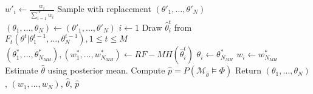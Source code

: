 \begin{algorithm}[H]
\begin{algorithmic}[1]
        \State $w'_i \leftarrow \frac{w_i}{\sum_{i=1}^N w_i} $
        \EndWhile
        \State Sample with replacement $(\theta'_1,\ldots,\theta'_N)$ 
        \State $(\theta_1,\ldots,\theta_N) \leftarrow (\theta'_1,\ldots,\theta'_N)$
        \State $i \leftarrow 1$
         
        \State Draw $\hat{\theta}^t_i$ from $F_t(\theta^t | \theta^{t-1}_1,\ldots,\theta^{t-1}_N), 1\leq t \leq M$
        \State $(\theta^*_1,\ldots,\theta^*_{N_{MH}}), (w^*_1,\ldots,w^*_{N_{MH}}) \leftarrow RF-MH(\hat{\theta}^t_i)$
        \State $\theta_i \leftarrow \theta^*_{N_{MH}}$
        \State $w_i \leftarrow w^*_{N_{MH}}$
        \EndWhile
        \EndWhile
        \State Estimate $\hat{\theta}$ using posterior mean.
        \State Compute $\hat{p}=P(\mathcal{M}_{\hat{\theta}} \models\Phi)$
        \State Return $(\theta_1,\ldots,\theta_{N})$, $(w_1,\ldots,w_{N})$, $\hat{\theta}$, $\hat{p}$
        \EndProcedure
    \end{algorithmic}
\end{algorithm}



